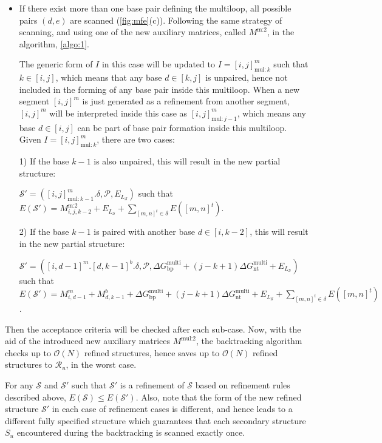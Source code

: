 \begin{enumerate}
\begin{itemize}
		
		\item  If there exist more than one  base pair defining the multiloop, all possible pairs $(d,e)$ are scanned (\cref{fig:mfe}(c)). Following the same strategy of scanning, and using one of the new auxiliary matrices, called $M^\text{m:2}$, in the \snMFE algorithm, \cref{algo:1}. 
		
		
		The generic form of $I$ in this case will be updated to $I = [i,j]^m_{\text{mul}:k}$ 	such that $k \in [i,j]$, which means that any base $d \in[k,j]$ is unpaired, hence not included in the forming of any base pair inside this multiloop.
		When a new segment $[i,j]^m$ is just generated as a refinement from another segment, 
		$[i,j]^m$ will be interpreted inside this case as $ [i,j]^m_{\text{mul}:j-1} $, which means any base $d \in [i,j]$ can be part of base pair formation inside this multiloop. 
		Given  $I = [i,j]^m_{\text{mul}:k}$, there are two cases:
		
		
		
		
		1) If the base $k-1$ is also unpaired, this will
		result in the new partial structure: 
		
		$\mathcal{S}' = ([i,j]^m_{\text{mul}:k-1}.\delta, \mathcal{P}, E_{L_{\mathcal{S}}})$ such that $E(\mathcal{S}') = M_{i,j,k-2}^\text{m:2} + E_{L_{\mathcal{S}}} + \sum \limits_{[m,n]^t \in \delta} E([m,n]^t)$. 
		
		2) If the base $k-1$ is paired with another base $d \in [i,k-2]$,  this will result in the new partial structure: 
		
		$\mathcal{S}' = ([i,d-1]^m.[d,k-1]^b.\delta, \mathcal{P},  \Delta G_\text{bp}^\text{multi} + (j-k + 1) \Delta G_\text{nt}^\text{multi} + E_{L_{\mathcal{S}}})$ such that $E(\mathcal{S}') =   M^m_{i,d-1} +  M^b_{d,k-1} + \Delta G_\text{bp}^\text{multi} + (j-k + 1)\Delta G_\text{nt}^\text{multi} +E_{L_{\mathcal{S}}} 
		+ \sum \limits_{[m,n]^t \in \delta} E([m,n]^t)$. 
		
		
	\end{itemize}
	
	Then the acceptance criteria will be checked after each sub-case. Now, with the aid of the introduced new auxiliary matrices $M^\text{mul:2}$, the backtracking algorithm   checks up to $\mathcal{O}(N)$ refined structures, hence saves up to  $\mathcal{O}(N)$ refined structures to $\mathcal{R}_u$, in the worst case.
	
\end{enumerate}

\begin{remark}
	For any $\mathcal{S}$ and  $\mathcal{S}'$ such that $\mathcal{S}'$ is a refinement of $\mathcal{S}$ based on refinement rules described above, $E(\mathcal{S}) \leq E(\mathcal{S}')$. Also, note that the form of the new refined structure $\mathcal{S}'$ in each case of refinement cases is different, and hence leads to a different fully specified structure which guarantees that each secondary structure $S_u$ encountered during the backtracking is scanned exactly once. 
\end{remark} 

